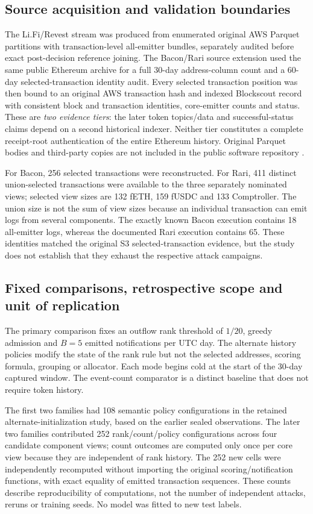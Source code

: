 \documentclass[preprint,12pt,authoryear]{elsarticle}
\begin{document}
\subsection{Source acquisition and validation boundaries}
The Li.Fi/Revest stream was produced from enumerated original AWS Parquet partitions with transaction-level all-emitter bundles, separately audited before exact post-decision reference joining. The Bacon/Rari source extension used the same public Ethereum archive for a full 30-day address-column count and a 60-day selected-transaction identity audit. Every selected transaction position was then bound to an original AWS transaction hash and indexed Blockscout record with consistent block and transaction identities, core-emitter counts and status. These are \emph{two evidence tiers}: the later token topics/data and successful-status claims depend on a second historical indexer. Neither tier constitutes a complete receipt-root authentication of the entire Ethereum history. Original Parquet bodies and third-party copies are not included in the public software repository \citep{AWS2026Dataset}.

For Bacon, 256 selected transactions were reconstructed. For Rari, 411 distinct union-selected transactions were available to the three separately nominated views; selected view sizes are 132 fETH, 159 fUSDC and 133 Comptroller. The union size is not the sum of view sizes because an individual transaction can emit logs from several components. The exactly known Bacon execution contains 18 all-emitter logs, whereas the documented Rari execution contains 65. These identities matched the original S3 selected-transaction evidence, but the study does not establish that they exhaust the respective attack campaigns.

\subsection{Fixed comparisons, retrospective scope and unit of replication}
The primary comparison fixes an outflow rank threshold of $1/20$, greedy admission and $B=5$ emitted notifications per UTC day. The alternate history policies modify the state of the rank rule but not the selected addresses, scoring formula, grouping or allocator. Each mode begins cold at the start of the 30-day captured window. The event-count comparator is a distinct baseline that does not require token history.

The first two families had 108 semantic policy configurations in the retained alternate-initialization study, based on the earlier sealed observations. The later two families contributed 252 rank/count/policy configurations across four candidate component views; count outcomes are computed only once per core view because they are independent of rank history. The 252 new cells were independently recomputed without importing the original scoring/notification functions, with exact equality of emitted transaction sequences. These counts describe reproducibility of computations, not the number of independent attacks, reruns or training seeds. No model was fitted to new test labels.
\end{document}
